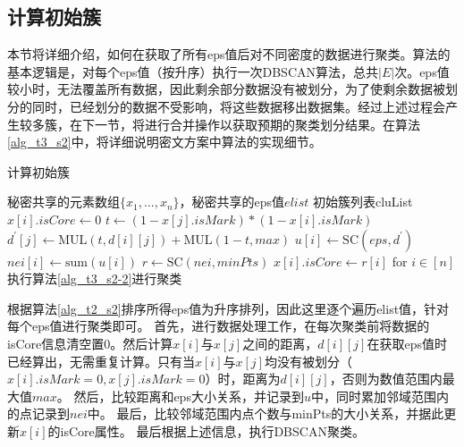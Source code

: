 \subsection{计算初始簇}
本节将详细介绍，如何在获取了所有eps值后对不同密度的数据进行聚类。算法的基本逻辑是，对每个eps值（按升序）执行一次DBSCAN算法，总共$|E|$次。eps值较小时，无法覆盖所有数据，因此剩余部分数据没有被划分，为了使剩余数据被划分的同时，已经划分的数据不受影响，将这些数据移出数据集。经过上述过程会产生较多簇，在下一节，将进行合并操作以获取预期的聚类划分结果。在算法\ref{alg_t3_s2}中，将详细说明密文方案中算法的实现细节。

\begin{algorithm}[htbp]
	\renewcommand{\algorithmicrequire}{\textbf{输入:}}
	\renewcommand{\algorithmicensure}{\textbf{输出:}}
	\caption{计算初始簇}
	\label{alg_t3_s2} %
	\begin{algorithmic}[1]
		\REQUIRE 秘密共享的元素数组$ \{x_1,...,x_n\} $，秘密共享的eps值$ elist $
		\ENSURE 初始簇列表cluList
		\STATE $x[i].isCore \leftarrow 0$ %
		\STATE $t \leftarrow ( 1- x[j].isMark) * (1-x[i].isMark)$
		\STATE $d^{\prime}[j] \leftarrow \text{MUL}(t,d[i][j])+\text{MUL}(1-t,max)$
		\ENDFOR
		\STATE $u[i] \leftarrow \text{SC}(eps, d^{\prime})$
		\STATE $nei[i] \leftarrow \text{sum}(u[i])$
		\ENDFOR
		\STATE $r \leftarrow \text{SC}(nei, minPts)$
		\STATE $x[i].isCore \leftarrow r[i]$ for $i\in[n]$
		\STATE 执行算法\ref{alg_t3_s2-2}进行聚类
		\ENDFOR
	\end{algorithmic}
\end{algorithm}

根据算法\ref{alg_t2_s2}排序所得eps值为升序排列，因此这里逐个遍历elist值，针对每个eps值进行聚类即可。
首先，进行数据处理工作，在每次聚类前将数据的isCore信息清空置0。然后计算$x[i]$与$x[j]$之间的距离，$d[i][j]$在获取eps值时已经算出，无需重复计算。只有当$x[i]$与$x[j]$均没有被划分（$x[i].isMark=0,x[j].isMark=0$）时，距离为$d[i][j]$，否则为数值范围内最大值$max$。
然后，比较距离和eps大小关系，并记录到$u$中，同时累加邻域范围内的点记录到$nei$中。
最后，比较邻域范围内点个数与minPts的大小关系，并据此更新$x[i]$的isCore属性。
最后根据上述信息，执行DBSCAN聚类。

